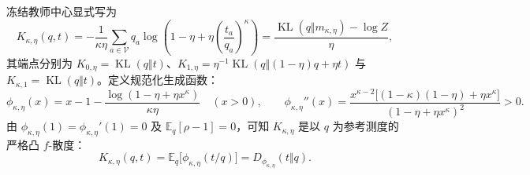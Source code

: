 \documentclass[lang=cn,scheme=chinese,openany]{elegantbook}
\newcommand{\E}{\mathbb E}
\newcommand{\KL}{\operatorname{KL}}
\begin{document}
冻结教师中心显式写为
\begin{equation}
 \boxed{K_{\kappa,\eta}(q,t)
 =-\frac1{\kappa\eta}\sum_{a\in\mathcal V} q_a
 \log\left(1-\eta+\eta\left(\frac{t_a}{q_a}\right)^\kappa\right)
 =\frac{\KL(q\Vert m_{\kappa,\eta})-\log Z}{\eta},}
 \label{eq:center-expanded-k}
\end{equation}
其端点分别为 $K_{0,\eta}=\KL(q\Vert t)$、$K_{1,\eta}=\eta^{-1}\KL(q\Vert(1-\eta)q+\eta t)$ 与 $K_{\kappa,1}=\KL(q\Vert t)$。定义规范化生成函数：
\begin{equation}
 \phi_{\kappa,\eta}(x)=x-1-\frac{\log(1-\eta+\eta x^\kappa)}{\kappa\eta}\quad(x>0),\qquad
 \phi_{\kappa,\eta}''(x)=\frac{x^{\kappa-2}\bigl[(1-\kappa)(1-\eta)+\eta x^\kappa\bigr]}{(1-\eta+\eta x^\kappa)^2}>0.
 \label{eq:center-convex-generator}
\end{equation}
由 $\phi_{\kappa,\eta}(1)=\phi_{\kappa,\eta}'(1)=0$ 及 $\E_q[\rho-1]=0$，可知 $K_{\kappa,\eta}$ 是以 $q$ 为参考测度的严格凸 $f$-散度：
\begin{equation}
 K_{\kappa,\eta}(q,t)=\E_q\bigl[\phi_{\kappa,\eta}(t/q)\bigr]=D_{\phi_{\kappa,\eta}}(t\Vert q).
 \label{eq:divergence-map-center-family}
\end{equation}
\end{document}
